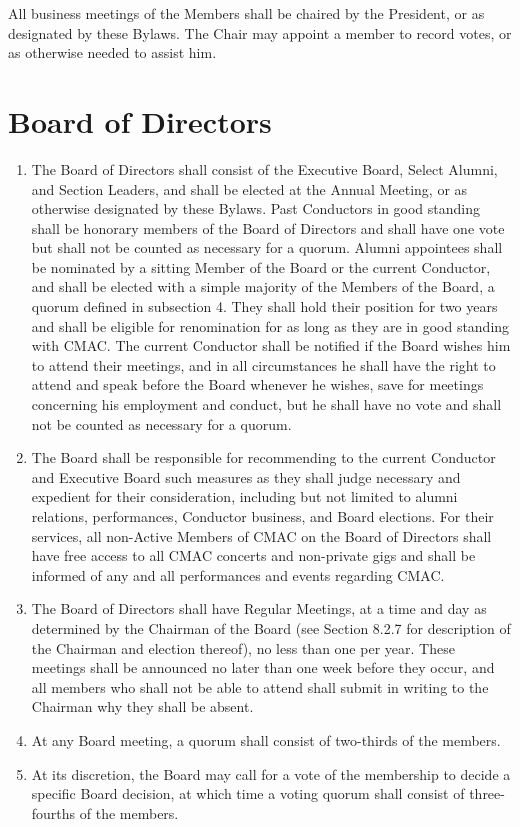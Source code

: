 \documentclass{article}
\begin{document}
All business meetings of the Members shall be chaired by the President,
or as designated by these Bylaws. The Chair may appoint a member to
record votes, or as otherwise needed to assist him.

\section{Board of Directors}
\begin{enumerate}
\item The Board of Directors shall consist of the Executive Board, Select
Alumni, and Section Leaders, and shall be elected at the Annual Meeting,
or as otherwise designated by these Bylaws. Past Conductors in good
standing shall be honorary members of the Board of Directors and shall
have one vote but shall not be counted as necessary for a quorum.
Alumni appointees shall be nominated by a sitting Member of the Board
or the current Conductor, and shall be elected with a simple majority
of the Members of the Board, a quorum defined in subsection 4. They
shall hold their position for two years and shall be eligible for
renomination for as long as they are in good standing with CMAC. The
current Conductor shall be notified if the Board wishes him to attend
their meetings, and in all circumstances he shall have the right to
attend and speak before the Board whenever he wishes, save for meetings
concerning his employment and conduct, but he shall have no vote and
shall not be counted as necessary for a quorum.
\item The Board shall be responsible for recommending to the current Conductor
and Executive Board such measures as they shall judge necessary and
expedient for their consideration, including but not limited to alumni
relations, performances, Conductor business, and Board elections.
For their services, all non-Active Members of CMAC on the Board of
Directors shall have free access to all CMAC concerts and non-private
gigs and shall be informed of any and all performances and events
regarding CMAC.
\item The Board of Directors shall have Regular Meetings, at a time and
day as determined by the Chairman of the Board (see Section 8.2.7
for description of the Chairman and election thereof), no less than
one per year. These meetings shall be announced no later than one
week before they occur, and all members who shall not be able to attend
shall submit in writing to the Chairman why they shall be absent.
\item At any Board meeting, a quorum shall consist of two-thirds of the
members.
\item At its discretion, the Board may call for a vote of the membership
to decide a specific Board decision, at which time a voting quorum
shall consist of three-fourths of the members.
\end{enumerate}
\end{document}
